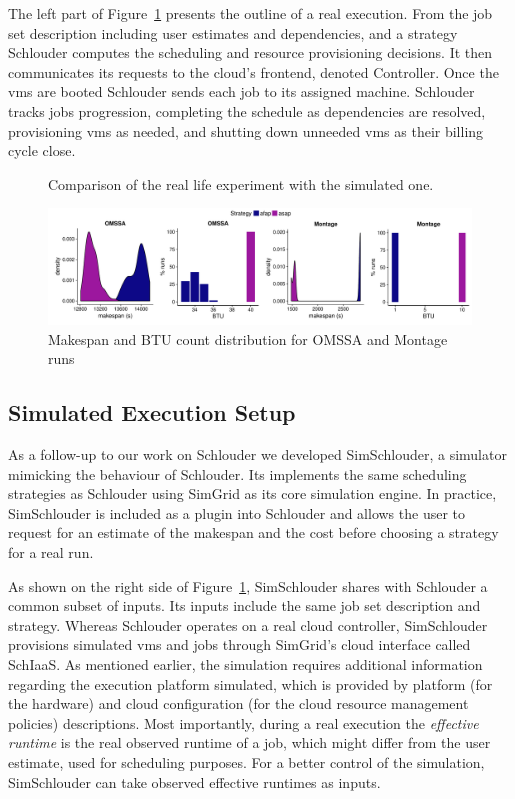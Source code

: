 \documentclass[10pt,conference,compsocconf]{IEEEtran}
\begin{document}
The left part  of Figure~\ref{fig:rs} presents the outline of  a real execution.
From the  job set description including  user estimates and dependencies,  and a
strategy   Schlouder  computes   the   scheduling   and  resource   provisioning
decisions. It  then communicates its  requests to the cloud's  frontend, denoted
Controller.   Once the  \acp{vm}  are booted  Schlouder sends  each  job to  its
assigned machine.  Schlouder tracks jobs progression, completing the schedule as
dependencies are  resolved, provisioning \acp{vm}  as needed, and  shutting down
unneeded \acp{vm} as their billing cycle close.

\begin{figure}
	\resizebox{0.5\textwidth}{!}{%
		
		
	}%
	\caption{Comparison of the real life experiment with the
	simulated one.}\label{fig:rs}
\end{figure}
\begin{figure}
	\centering
	\includegraphics[width=\textwidth]{gfx/real_plot.pdf}
	\caption{Makespan and BTU count distribution for OMSSA and Montage
	runs\label{fig:realbrs}}
\end{figure}

\subsection{Simulated Execution Setup}
As a follow-up  to our work on Schlouder we  developed SimSchlouder, a simulator
mimicking  the  behaviour  of  Schlouder. Its  implements  the  same  scheduling
strategies  as  Schlouder  using  SimGrid  as its  core  simulation  engine.  In
practice, SimSchlouder  is included as  a plugin  into Schlouder and  allows the
user to request for  an estimate of the makespan and the  cost before choosing a
strategy for a real run.

As  shown on  the right  side of  Figure~\ref{fig:rs}, SimSchlouder  shares with
Schlouder  a common  subset of  inputs.   Its inputs  include the  same job  set
description  and  strategy.    Whereas  Schlouder  operates  on   a  real  cloud
controller,  SimSchlouder   provisions  simulated  \acp{vm}  and   jobs  through
SimGrid's cloud interface  called SchIaaS. As mentioned  earlier, the simulation
requires  additional information  regarding  the  execution platform  simulated,
which is  provided by platform (for  the hardware) and cloud  configuration (for
the cloud resource management  policies) descriptions.  Most importantly, during
a real execution the \emph{effective runtime}  is the real observed runtime of a
job,  which   might  differ  from   the  user  estimate,  used   for  scheduling
purposes. For a better control of the simulation, SimSchlouder can take observed
effective runtimes as inputs.
\end{document}

